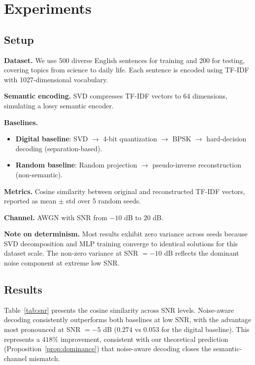 \documentclass[a4paper,fleqn]{cas-sc}
\begin{document}
\section{Experiments}\label{sec:sim}

\subsection{Setup}

\textbf{Dataset.} We use 500 diverse English sentences for training and 200 for testing, covering topics from science to daily life. Each sentence is encoded using TF-IDF with 1027-dimensional vocabulary.

\textbf{Semantic encoding.} SVD compresses TF-IDF vectors to 64 dimensions, simulating a lossy semantic encoder.

\textbf{Baselines.}
\begin{itemize}
\item \textbf{Digital baseline}: SVD $\to$ 4-bit quantization $\to$ BPSK $\to$ hard-decision decoding (separation-based).
\item \textbf{Random baseline}: Random projection $\to$ pseudo-inverse reconstruction (non-semantic).
\end{itemize}

\textbf{Metrics.} Cosine similarity between original and reconstructed TF-IDF vectors, reported as mean $\pm$ std over 5 random seeds.

\textbf{Channel.} AWGN with SNR from $-10$ dB to $20$ dB.

\textbf{Note on determinism.} Most results exhibit zero variance across seeds because SVD decomposition and MLP training converge to identical solutions for this dataset scale. The non-zero variance at SNR $= -10$ dB reflects the dominant noise component at extreme low SNR.

\subsection{Results}

Table~\ref{tab:snr} presents the cosine similarity across SNR levels. Noise-aware decoding consistently outperforms both baselines at low SNR, with the advantage most pronounced at SNR $= -5$ dB ($0.274$ vs $0.053$ for the digital baseline). This represents a $418\%$ improvement, consistent with our theoretical prediction (Proposition~\ref{prop:dominance}) that noise-aware decoding closes the semantic-channel mismatch.
\end{document}
